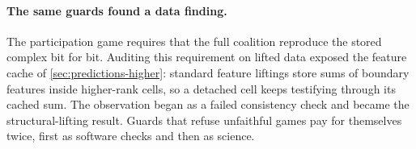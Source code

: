 \paragraph{The same guards found a data finding.}
The participation game requires that the full coalition reproduce the
stored complex bit for bit. Auditing this requirement on lifted data
exposed the feature cache of \cref{sec:predictions-higher}: standard
feature liftings store sums of boundary features inside higher-rank
cells, so a detached cell keeps testifying through its cached sum. The
observation began as a failed consistency check and became the
structural-lifting result. Guards that refuse unfaithful games pay for
themselves twice, first as software checks and then as science.
